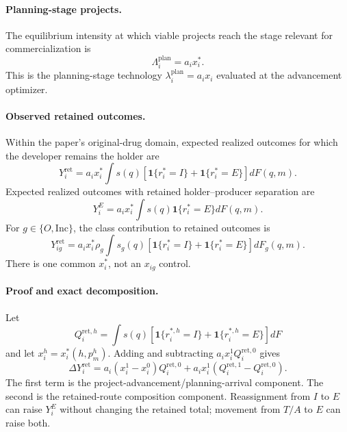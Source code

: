 \paragraph{Planning-stage projects.}
The equilibrium intensity at which viable projects reach the stage relevant
for commercialization is
\begin{equation}
  \Lambda_i^{\mathrm{plan}}
  =
  a_ix_i^*.
  \label{eq:p08-planning-arrival}
\end{equation}
This is the planning-stage technology
\(\lambda_i^{\mathrm{plan}}=a_ix_i\) evaluated at the advancement optimizer.

\paragraph{Observed retained outcomes.}
Within the paper's original-drug domain, expected realized outcomes for which
the developer remains the holder are
\begin{equation}
  Y_i^{\mathrm{ret}}
  =
  a_ix_i^*
  \int
  s(q)
  \left[
    \mathbf 1\{r_i^*=I\}
    +
    \mathbf 1\{r_i^*=E\}
  \right]
  dF(q,m).
  \label{eq:p08-retained-outcome}
\end{equation}
Expected realized outcomes with retained holder--producer separation are
\begin{equation}
  Y_i^E
  =
  a_ix_i^*
  \int
  s(q)\mathbf 1\{r_i^*=E\}
  dF(q,m).
  \label{eq:p08-entrusted-outcome}
\end{equation}
For \(g\in\{O,\mathrm{Inc}\}\), the class contribution to retained
outcomes is
\begin{equation}
  Y_{ig}^{\mathrm{ret}}
  =
  a_ix_i^*\rho_g
  \int
  s_g(q)
  \left[
    \mathbf 1\{r_i^*=I\}
    +
    \mathbf 1\{r_i^*=E\}
  \right]
  dF_g(q,m).
  \label{eq:p08-type-outcome}
\end{equation}
There is one common \(x_i^*\), not an \(x_{ig}\) control.

\paragraph{Proof and exact decomposition.}
Let
\[
  Q_i^{\mathrm{ret},h}
  =
  \int s(q)
  [\mathbf 1\{r_i^{*,h}=I\}+\mathbf 1\{r_i^{*,h}=E\}]
  dF
\]
and let \(x_i^h=x_i^*(h,p_m^h)\). Adding and subtracting
\(a_ix_i^1Q_i^{\mathrm{ret},0}\) gives
\begin{equation}
  \Delta Y_i^{\mathrm{ret}}
  =
  a_i(x_i^1-x_i^0)Q_i^{\mathrm{ret},0}
  +
  a_ix_i^1
  (Q_i^{\mathrm{ret},1}-Q_i^{\mathrm{ret},0}).
  \label{eq:p08-outcome-decomposition}
\end{equation}
The first term is the project-advancement/planning-arrival component. The
second is the retained-route composition component. Reassignment from \(I\)
to \(E\) can raise \(Y_i^E\) without changing the retained total; movement
from \(T/A\) to \(E\) can raise both.

